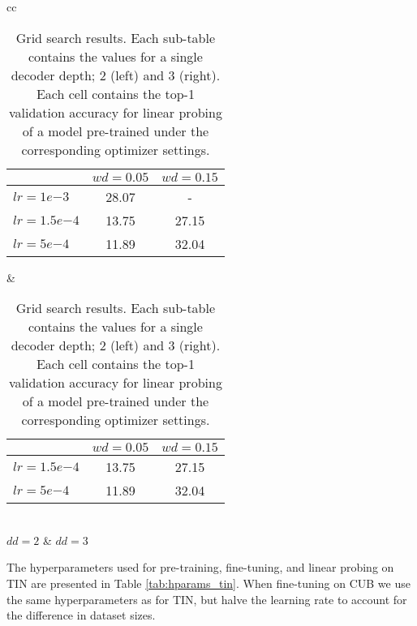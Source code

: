 \begin{table}[!htb]
\centering
\begin{tabular}{ cc }   %
\begin{tabular}{ l|cc } 
\toprule
 & $wd{=}0.05$ & $wd{=}0.15$ \\\midrule
$lr{=}1e{-3}$ & 28.07 & - \\
$lr{=}1.5e{-4}$ & 13.75 & 27.15 \\
$lr{=}5e{-4}$ & 11.89 & 32.04 \\
\bottomrule  
\end{tabular} \vspace{1mm} &  %
\begin{tabular}{ l|cc } 
\toprule
 & $wd{=}0.05$ & $wd{=}0.15$ \\\midrule
$lr{=}1.5e{-4}$ & 13.75 & 27.15 \\
$lr{=}5e{-4}$ & 11.89 & 32.04 \\
\bottomrule  
\end{tabular} \vspace{1mm} \\
$dd=2$ & $dd=3$ \\  
\end{tabular}
\vspace{-2mm}
\caption{Grid search results. Each sub-table contains the values for a single decoder depth; 2 (left) and 3 (right). Each cell contains the top-1 validation accuracy for linear probing of a model pre-trained under the corresponding optimizer settings.\label{tab:gridsearch}}
\end{table}

The hyperparameters used for pre-training, fine-tuning, and linear probing on TIN are presented in Table \ref{tab:hparams_tin}. When fine-tuning on CUB we use the same hyperparameters as for TIN, but halve the learning rate to account for the difference in dataset sizes.

